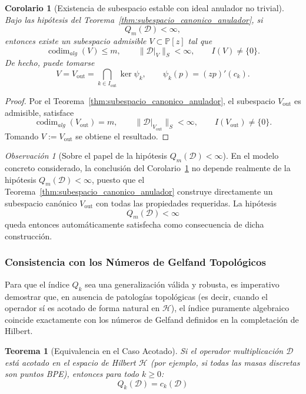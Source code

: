 \documentclass[12pt,a4paper]{article}
\newtheorem{theorem}{Teorema}
\newtheorem{corollary}{Corolario}
\theoremstyle{definition}
\theoremstyle{remark}
\newtheorem{remark}{Observación}
\begin{document}
\begin{corollary}[Existencia de subespacio estable con ideal anulador no trivial]
	\label{cor:existencia_subespacio_anulador}
	Bajo las hipótesis del Teorema~\ref{thm:subespacio_canonico_anulador}, si
	\[
		Q_m(\mathcal D)<\infty,
	\]
	entonces existe un subespacio admisible $V\subset\mathbb P[z]$ tal que
	\[
		\operatorname{codim}_{alg}(V)\le m,
		\qquad
		\|\mathcal D|_V\|_S<\infty,
		\qquad
		I(V)\neq\{0\}.
	\]
	De hecho, puede tomarse
	\[
		V=V_{\mathrm{out}}
		=
		\bigcap_{k\in I_{\mathrm{out}}}\ker\psi_k,
		\qquad
		\psi_k(p)=(zp)'(c_k).
	\]
\end{corollary}

\begin{proof}
	Por el Teorema~\ref{thm:subespacio_canonico_anulador}, el subespacio $V_{\mathrm{out}}$
	es admisible, satisface
	\[
		\operatorname{codim}_{alg}(V_{\mathrm{out}})=m,
		\qquad
		\|\mathcal D|_{V_{\mathrm{out}}}\|_S<\infty,
		\qquad
		I(V_{\mathrm{out}})\neq\{0\}.
	\]
	Tomando $V:=V_{\mathrm{out}}$ se obtiene el resultado.
\end{proof}

\begin{remark}[Sobre el papel de la hipótesis $Q_m(\mathcal D)<\infty$]
	En el modelo concreto considerado, la conclusión del Corolario~\ref{cor:existencia_subespacio_anulador}
	no depende realmente de la hipótesis $Q_m(\mathcal D)<\infty$, puesto que el
	Teorema~\ref{thm:subespacio_canonico_anulador} construye directamente un subespacio
	canónico $V_{\mathrm{out}}$ con todas las propiedades requeridas. La hipótesis
	\[
		Q_m(\mathcal D)<\infty
	\]
	queda entonces automáticamente satisfecha como consecuencia de dicha construcción.
\end{remark}

\subsubsection{Consistencia con los Números de Gelfand Topológicos}

Para que el índice $Q_k$ sea una generalización válida y robusta, es imperativo demostrar que, en ausencia de patologías topológicas (es decir, cuando el operador sí es acotado de forma natural en $\mathcal{H}$), el índice puramente algebraico coincide exactamente con los números de Gelfand definidos en la completación de Hilbert.

\begin{theorem}[Equivalencia en el Caso Acotado]\label{thm:equivalencia_Qk_Gelfand}
	Si el operador multiplicación $\mathcal{D}$ está acotado en el espacio de Hilbert $\mathcal{H}$ (por ejemplo, si todas las masas discretas son puntos BPE), entonces para todo $k \ge 0$:
	$$ Q_k(\mathcal{D}) = c_k(\mathcal{D}) $$
\end{theorem}
\end{document}
